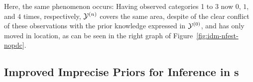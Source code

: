 \begin{example}
\label{ex:jstp-6}
Here, the same phenomenon occurs:
Having observed categories 1 to 3 now $0$, $1$, and $4$
times, respectively, $\mathcal{Y}^{(n)}$ covers the same area, despite of the clear conflict of these
observations with the prior knowledge expressed in $\mathcal{Y}^{(0)}$,
and has only moved in location, as can be seen
in the right graph of Figure~\ref{fig:idm-nfest-nopdc}.
\end{example}


\subsection{Improved Imprecise Priors for Inference in \model s}
\label{sec:4-gw-071216}

